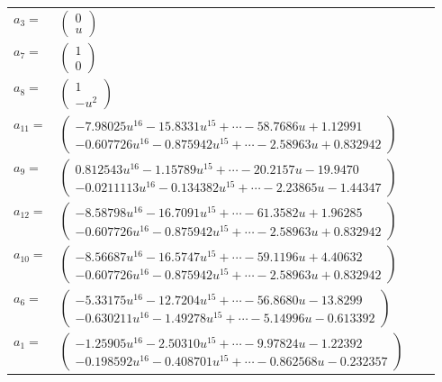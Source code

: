 \documentclass[1p]{elsarticle_modified}
\theoremstyle{definition}
\begin{document}
\begin{tabular}{m{7pt} m{180pt} m{7pt} m{180pt} }
\flushright $a_{3}=$&$\begin{pmatrix}0\\u\end{pmatrix}$ \\
\flushright $a_{7}=$&$\begin{pmatrix}1\\0\end{pmatrix}$ \\
\flushright $a_{8}=$&$\begin{pmatrix}1\\- u^2\end{pmatrix}$ \\
\flushright $a_{11}=$&$\begin{pmatrix}-7.98025 u^{16}-15.8331 u^{15}+\cdots-58.7686 u+1.12991\\-0.607726 u^{16}-0.875942 u^{15}+\cdots-2.58963 u+0.832942\end{pmatrix}$ \\
\flushright $a_{9}=$&$\begin{pmatrix}0.812543 u^{16}-1.15789 u^{15}+\cdots-20.2157 u-19.9470\\-0.0211113 u^{16}-0.134382 u^{15}+\cdots-2.23865 u-1.44347\end{pmatrix}$ \\
\flushright $a_{12}=$&$\begin{pmatrix}-8.58798 u^{16}-16.7091 u^{15}+\cdots-61.3582 u+1.96285\\-0.607726 u^{16}-0.875942 u^{15}+\cdots-2.58963 u+0.832942\end{pmatrix}$ \\
\flushright $a_{10}=$&$\begin{pmatrix}-8.56687 u^{16}-16.5747 u^{15}+\cdots-59.1196 u+4.40632\\-0.607726 u^{16}-0.875942 u^{15}+\cdots-2.58963 u+0.832942\end{pmatrix}$ \\
\flushright $a_{6}=$&$\begin{pmatrix}-5.33175 u^{16}-12.7204 u^{15}+\cdots-56.8680 u-13.8299\\-0.630211 u^{16}-1.49278 u^{15}+\cdots-5.14996 u-0.613392\end{pmatrix}$ \\
\flushright $a_{1}=$&$\begin{pmatrix}-1.25905 u^{16}-2.50310 u^{15}+\cdots-9.97824 u-1.22392\\-0.198592 u^{16}-0.408701 u^{15}+\cdots-0.862568 u-0.232357\end{pmatrix}$ \\

\end{tabular}
\end{document}
